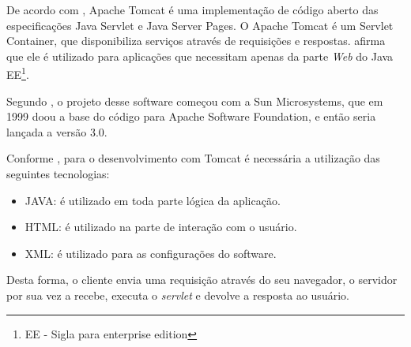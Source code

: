 
	\par De acordo com , Apache Tomcat é uma implementação
de código aberto das especificações Java Servlet e Java Server Pages. O Apache
Tomcat é um Servlet Container, que disponibiliza serviços através de
requisições e respostas.  afirma que ele é utilizado para
aplicações que necessitam apenas da parte \textit{Web} do Java EE\footnote{EE -
Sigla para enterprise edition}.

	\par Segundo , o projeto desse software começou com a
Sun Microsystems, que em 1999 doou a base do código para Apache Software Foundation, e então seria lançada a versão 3.0.

	\par Conforme , para o desenvolvimento com
Tomcat é necessária a utilização das seguintes tecnologias:
	
	\begin{itemize}
	  
	  \item JAVA: é utilizado em toda parte lógica da aplicação.
	  
	  \item HTML: é utilizado na parte de interação com o usuário.
	  
	  \item XML: é utilizado para as configurações do software. 
	
	\end{itemize}
 
 
 
	\par Desta forma, o cliente envia uma requisição através do seu navegador, o
servidor por sua vez a recebe, executa o \textit{servlet} e devolve a resposta
ao usuário.